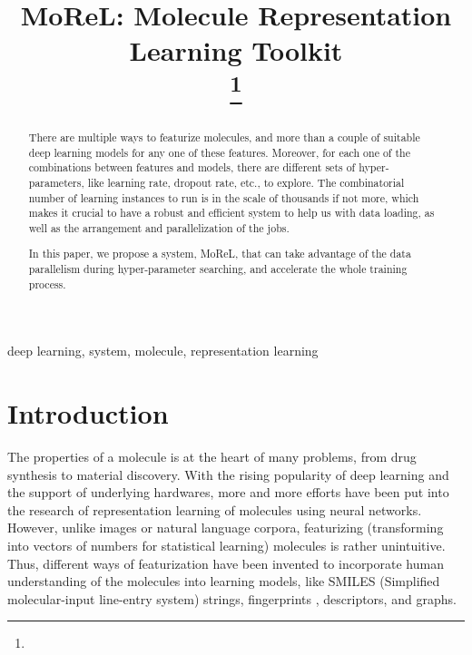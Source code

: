 \documentclass[conference]{IEEEtran}
\begin{document}
\title{MoReL: Molecule Representation Learning Toolkit\\
	{
		\footnotesize \textsuperscript{}
	}
		\thanks{}
}

\author{
}

\maketitle

\begin{abstract}
There are multiple ways to featurize molecules, and more than a couple of suitable deep learning models for any one of these features. 
Moreover, for each one of the combinations between features and models, there are different sets of hyper-parameters, like learning rate, dropout rate, etc., to explore. 
The combinatorial number of learning instances to run is in the scale of thousands if not more, which makes it crucial to have a robust and efficient system to help us with data loading, as well as the arrangement and parallelization of the jobs. 

In this paper, we propose a system, MoReL, that can take advantage of the data parallelism during hyper-parameter searching, and accelerate the whole training process.
\end{abstract}

\begin{IEEEkeywords}
deep learning, system, molecule, representation learning
\end{IEEEkeywords}

\section{Introduction} \label{sec_intro} 

The properties of a molecule is at the heart of many problems, from drug synthesis to material discovery. 
With the rising popularity of deep learning and the support of underlying hardwares, more and more efforts have been put into the research of representation learning of molecules using neural networks. 
However, unlike images or natural language corpora, featurizing (transforming into vectors of numbers for statistical learning) molecules is rather unintuitive. 
Thus, different ways of featurization have been invented to incorporate human understanding of the molecules into learning models, like SMILES (Simplified molecular-input line-entry system) strings, fingerprints \cite{ecfp}, descriptors, and graphs. 
\end{document}
